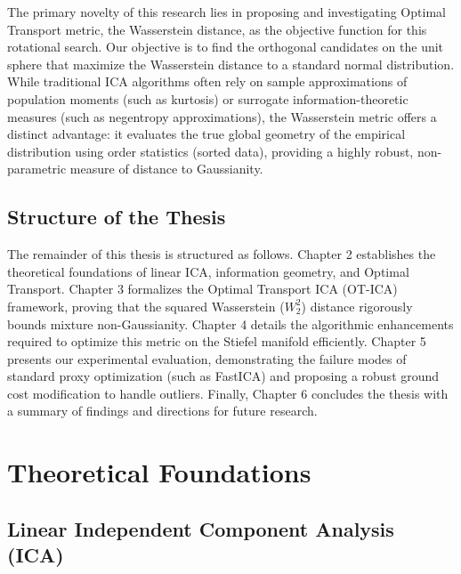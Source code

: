 \documentclass[12pt,a4paper,twoside,openany]{book}
\begin{document}
The primary novelty of this research lies in proposing and investigating Optimal Transport metric, the Wasserstein distance, as the objective function for this rotational search. 
Our objective is to find the orthogonal candidates on the unit sphere that maximize the Wasserstein distance to a standard normal distribution. 
While traditional ICA algorithms often rely on sample approximations of population moments (such as kurtosis) or surrogate information-theoretic measures (such as negentropy approximations), 
the Wasserstein metric offers a distinct advantage: 
it evaluates the true global geometry of the empirical distribution using order statistics (sorted data), providing a highly robust, non-parametric measure of distance to Gaussianity. 

\section{Structure of the Thesis}
The remainder of this thesis is structured as follows. Chapter 2 establishes the theoretical foundations of linear ICA, information geometry, and Optimal Transport. 
Chapter 3 formalizes the Optimal Transport ICA (OT-ICA) framework, proving that the squared Wasserstein ($W_2^2$) distance rigorously bounds mixture non-Gaussianity. 
Chapter 4 details the algorithmic enhancements required to optimize this metric on the Stiefel manifold efficiently. 
Chapter 5 presents our experimental evaluation, demonstrating the failure modes of standard proxy optimization (such as FastICA) and proposing a robust ground cost modification to handle outliers. 
Finally, Chapter 6 concludes the thesis with a summary of findings and directions for future research.


\chapter{Theoretical Foundations}

\section{Linear Independent Component Analysis (ICA)}
\end{document}
